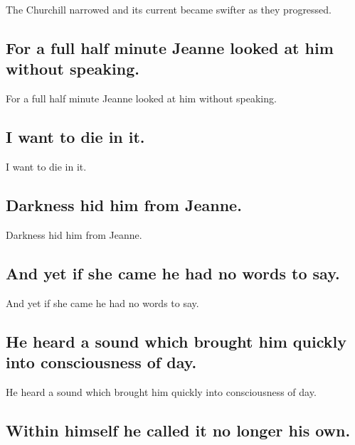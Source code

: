 \documentclass[]{article}
\begin{document}
The Churchill narrowed and its current became swifter as they
progressed.

\hypertarget{for-a-full-half-minute-jeanne-looked-at-him-without-speaking.}{%
\subsection{For a full half minute Jeanne looked at him without
speaking.}\label{for-a-full-half-minute-jeanne-looked-at-him-without-speaking.}}

For a full half minute Jeanne looked at him without speaking.

\hypertarget{i-want-to-die-in-it.}{%
\subsection{I want to die in it.}\label{i-want-to-die-in-it.}}

I want to die in it.

\hypertarget{darkness-hid-him-from-jeanne.}{%
\subsection{Darkness hid him from
Jeanne.}\label{darkness-hid-him-from-jeanne.}}

Darkness hid him from Jeanne.

\hypertarget{and-yet-if-she-came-he-had-no-words-to-say.}{%
\subsection{And yet if she came he had no words to
say.}\label{and-yet-if-she-came-he-had-no-words-to-say.}}

And yet if she came he had no words to say.

\hypertarget{he-heard-a-sound-which-brought-him-quickly-into-consciousness-of-day.}{%
\subsection{He heard a sound which brought him quickly into
consciousness of
day.}\label{he-heard-a-sound-which-brought-him-quickly-into-consciousness-of-day.}}

He heard a sound which brought him quickly into consciousness of day.

\hypertarget{within-himself-he-called-it-no-longer-his-own.}{%
\subsection{Within himself he called it no longer his
own.}\label{within-himself-he-called-it-no-longer-his-own.}}
\end{document}
